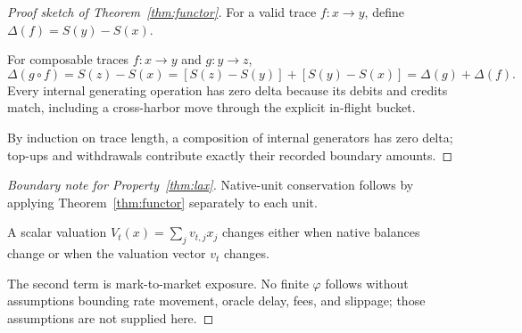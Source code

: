 \documentclass[11pt,a4paper]{article}
\theoremstyle{definition}
\theoremstyle{definition}
\theoremstyle{remark}
\begin{document}
\begin{proof}[Proof sketch of Theorem~\ref{thm:functor}]
\setlength{\parskip}{4pt plus 1pt}
For a valid trace $f:x\to y$, define $\Delta(f)=S(y)-S(x)$. 

For composable traces
$f:x\to y$ and $g:y\to z$,
\[
\Delta(g\circ f)=S(z)-S(x)=[S(z)-S(y)]+[S(y)-S(x)]
=\Delta(g)+\Delta(f).
\]
Every internal generating operation has zero delta because its debits and credits
match, including a cross-harbor move through the explicit in-flight bucket. 

By
induction on trace length, a composition of internal generators has zero delta;
top-ups and withdrawals contribute exactly their recorded boundary amounts.
\end{proof}

\begin{proof}[Boundary note for Property~\ref{thm:lax}]
\setlength{\parskip}{4pt plus 1pt}
Native-unit conservation follows by applying Theorem~\ref{thm:functor} separately
to each unit. 

A scalar valuation $V_t(x)=\sum_j v_{t,j}x_j$ changes either when
native balances change or when the valuation vector $v_t$ changes. 

The second term
is mark-to-market exposure. No finite $\varphi$ follows without assumptions bounding
rate movement, oracle delay, fees, and slippage; those assumptions are not supplied
here.
\end{proof}
\end{document}
